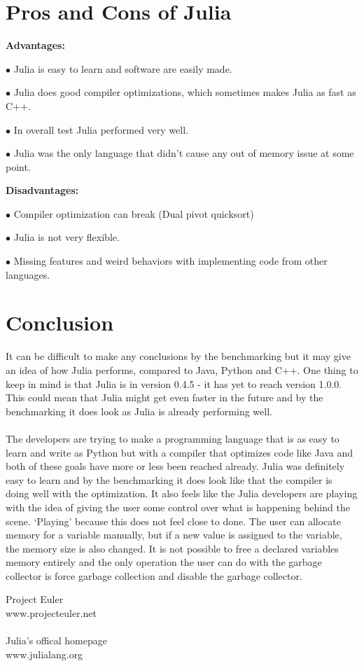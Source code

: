 \documentclass[landscape, a0]{sciposter}
\begin{document}
\begin{multicols}{3}
\section{Pros and Cons of Julia}
\textbf{Advantages:}
\begin{list}{}{}
	\item[$\bullet$] Julia is easy to learn and software are easily made.
	\item[$\bullet$] Julia does good compiler optimizations, which sometimes makes Julia as fast as C++.
	\item[$\bullet$] In overall test Julia performed very well.
	\item[$\bullet$] Julia was the only language that didn't cause any out of memory issue at some point.
\end{list}
\textbf{Disadvantages:}
\begin{list}{}{}
	\item[$\bullet$] Compiler optimization can break (Dual pivot quicksort)
	\item[$\bullet$] Julia is not very flexible.
	\item[$\bullet$] Missing features and weird behaviors with implementing code from other languages.
\end{list}

\section{Conclusion}
It can be difficult to make any conclusions by the benchmarking but it may give an idea of how Julia performs, compared to Java, Python and C++. One thing to keep in mind is that Julia is in version 0.4.5 - it has yet to reach version 1.0.0. This could mean that Julia might get even faster in the future and by the benchmarking it does look as Julia is already performing well. \\ \\ The developers are trying to make a programming language that is as easy to learn and write as Python but with a compiler that optimizes code like Java and both of these goals have more or less been reached already. Julia was definitely easy to learn and by the benchmarking it does look like that the compiler is doing well with the optimization. It also feels like the Julia developers are playing with the idea of giving the user some control over what is happening behind the scene. ‘Playing’ because this does not feel close to done. The user can allocate memory for a variable manually, but if a new value is assigned to the variable, the memory size is also changed. It is not possible to free a declared variables memory entirely and the only operation the user can do with the garbage collector is force garbage collection and disable the garbage collector. 

\begin{thebibliography}{m}

Project Euler\\
www.projecteuler.net\\
\\
Julia's offical homepage\\
www.julialang.org


\end{thebibliography}


\end{multicols}
\end{document}
